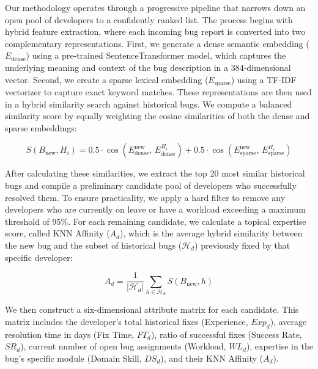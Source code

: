 \documentclass[sigconf,review,anonymous]{acmart}
\begin{document}
Our methodology operates through a progressive pipeline that narrows down an open pool of developers to a confidently ranked list. The process begins with hybrid feature extraction, where each incoming bug report is converted into two complementary representations. First, we generate a dense semantic embedding ($E_{\text{dense}}$) using a pre-trained SentenceTransformer model, which captures the underlying meaning and context of the bug description in a 384-dimensional vector. Second, we create a sparse lexical embedding ($E_{\text{sparse}}$) using a TF-IDF vectorizer to capture exact keyword matches. These representations are then used in a hybrid similarity search against historical bugs. We compute a balanced similarity score by equally weighting the cosine similarities of both the dense and sparse embeddings:

\begin{equation}
S(B_{\text{new}}, H_i) = 0.5\cdot\cos\!\left(E^{\text{new}}_{\text{dense}},\,E^{H_i}_{\text{dense}}\right) + 0.5\cdot\cos\!\left(E^{\text{new}}_{\text{sparse}},\,E^{H_i}_{\text{sparse}}\right)
\label{eq:hybrid_sim}
\end{equation}

After calculating these similarities, we extract the top 20 most similar historical bugs and compile a preliminary candidate pool of developers who successfully resolved them. To ensure practicality, we apply a hard filter to remove any developers who are currently on leave or have a workload exceeding a maximum threshold of 95\%. For each remaining candidate, we calculate a topical expertise score, called KNN Affinity ($A_d$), which is the average hybrid similarity between the new bug and the subset of historical bugs ($\mathcal{H}_d$) previously fixed by that specific developer:

\begin{equation}
A_d = \frac{1}{|\mathcal{H}_d|}\sum_{h \in \mathcal{H}_d} S(B_{\text{new}}, h)
\label{eq:knn_affinity}
\end{equation}

We then construct a six-dimensional attribute matrix for each candidate. This matrix includes the developer's total historical fixes (Experience, $\mathit{Exp}_d$), average resolution time in days (Fix Time, $FT_d$), ratio of successful fixes (Success Rate, $SR_d$), current number of open bug assignments (Workload, $WL_d$), expertise in the bug's specific module (Domain Skill, $DS_d$), and their KNN Affinity ($A_d$).
\end{document}
